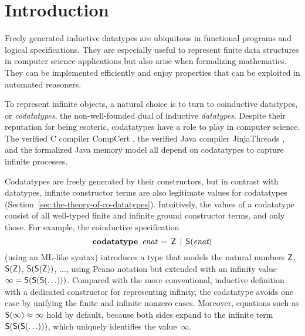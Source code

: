 \setcounter{footnote}{0}

\section{Introduction}
\label{sec:introduction}

Freely generated inductive datatypes are ubiquitous in functional programs and
logical specifications. They are especially
useful to represent finite data structures in computer science applications but
also arise when formalizing mathematics.
They can be implemented efficiently and enjoy
properties that can be exploited in automated reasoners.
%

To represent infinite objects, %
a natural choice is to turn to coinductive datatypes, or \emph{codatatypes},
the non-well-founded dual of inductive \emph{datatypes}.
%
Despite their reputation for being esoteric, codatatypes have a
role to play in computer science. The verified C compiler CompCert
\cite{leroy-2009}, the verified Java compiler Jinja\-Threads
\cite{lochbihler-2010-jinja}, and the formalized Java memory model
\cite{lochbihler-2014-jmm} all depend on codatatypes to capture infinite
processes.

Codatatypes are freely generated by their constructors, but in contrast with datatypes,
infinit\-e constructor terms are also legitimate values for codatatypes
(Section~\ref{sec:the-theory-of-co-datatypes}). Intuitively, the
values of a codatatype consist of all well-typed finite and infinite ground
constructor
terms, and only those. For example, the coinductive specification
%
\[\textbf{codatatype}~\,\textit{enat} \,=\, \textsf{Z} \,\mid\, \textsf{S}(\textit{enat})\]
%
(using an ML-like syntax) introduces a type that
models the natural numbers $\textsf{Z}$, $\textsf{S}(\textsf{Z})$, $\textsf{S}(\textsf{S}(\textsf{Z}))$, $\ldots$\afterLdots{},
using Peano notation but extended with an
infinity value $\infty = \textsf{S}(\textsf{S}(\textsf{S}(\ldots)))$. Compared
with the more conventional, inductive definition with a dedicated constructor
for representing infinity,
%
the codatatype avoids one case by unifying the finite and infinite nonzero cases.
Moreover, equations such as $\textsf{S}(\infty) \approx \infty$ hold by default,
because both sides expand to the infinite term
$\textsf{S}(\textsf{S}(\textsf{S}(\ldots)))$, which uniquely identifies the
value~$\infty$.

